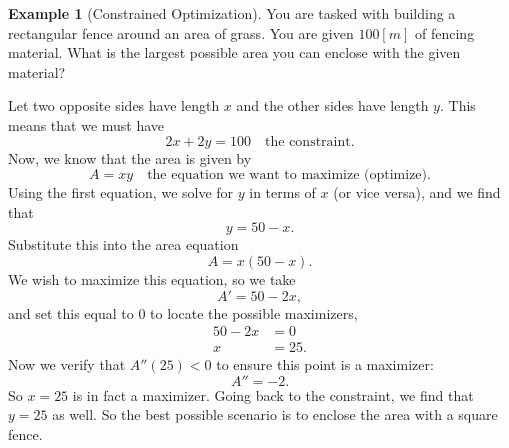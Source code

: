 \documentclass[12pt]{article}
\theoremstyle{definition}
\newtheorem{example}{Example}[section]
\begin{document}
\begin{example}[Constrained Optimization]
You are tasked with building a rectangular fence around an area of grass.  You are given $100[m]$ of fencing material.  What is the largest possible area you can enclose with the given material?

Let two opposite sides have length $x$ and the other sides have length $y$. This means that we must have
\[
2x+2y=100 \quad \textrm{the constraint}.
\]
Now, we know that the area is given by
\[
A=xy \quad \textrm{the equation we want to maximize (optimize)}.
\]
Using the first equation, we solve for $y$ in terms of $x$ (or vice versa), and we find that
\[
y=50-x.
\]
Substitute this into the area equation
\[
A=x(50-x).
\]
We wish to maximize this equation, so we take
\[
A'=50-2x,
\]
and set this equal to 0 to locate the possible maximizers,
\begin{align*}
50-2x&=0\\
x&=25.
\end{align*}
Now we verify that $A''(25)<0$ to ensure this point is a maximizer:
\[
A''=-2.
\]
So $x=25$ is in fact a maximizer. Going back to the constraint, we find that $y=25$ as well. So the best possible scenario is to enclose the area with a square fence.
\end{example}









\end{document}
